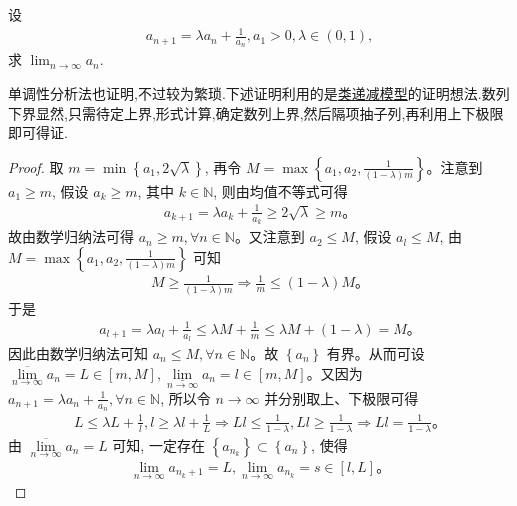 \documentclass[lang=cn,newtx,10pt,scheme=chinese]{../Template/elegantbook}
\begin{document}
\begin{example}
设
\begin{align*}
a_{n+1} = \lambda a_n + \frac{1}{a_n}, a_1 > 0, \lambda \in (0,1),
\end{align*}
求 $\lim_{n \to \infty} a_n$.
\end{example}
\begin{note}
单调性分析法也证明,不过较为繁琐.下述证明利用的是\hyperref[Basis of Analytics-example:类递减模型]{类递减模型}的证明想法.数列下界显然,只需待定上界,形式计算,确定数列上界,然后隔项抽子列,再利用上下极限即可得证.
\end{note}
\begin{proof}
取 $m=\min \left\{ a_1,2\sqrt{\lambda} \right\}$, 再令 $M=\max \left\{ a_1,a_2,\frac{1}{\left( 1-\lambda \right) m} \right\}$。注意到 $a_1\geqslant m$, 假设 $a_k\geqslant m$, 其中 $k\in \mathbb{N}$, 则由均值不等式可得
\begin{align*}
a_{k+1}=\lambda a_k+\frac{1}{a_k}\geqslant 2\sqrt{\lambda}\geqslant m。
\end{align*}
故由数学归纳法可得 $a_n\geqslant m,\forall n\in \mathbb{N}$。又注意到 $a_2\leqslant M$, 假设 $a_l\leqslant M$, 由 $M=\max \left\{ a_1,a_2,\frac{1}{\left( 1-\lambda \right) m} \right\}$ 可知
\begin{align*}
M\geqslant \frac{1}{\left( 1-\lambda \right) m}\Rightarrow \frac{1}{m}\leqslant \left( 1-\lambda \right) M。
\end{align*}
于是
\begin{align*}
a_{l+1}=\lambda a_l+\frac{1}{a_l}\leqslant \lambda M+\frac{1}{m}\leqslant \lambda M+\left( 1-\lambda \right) =M。
\end{align*}
因此由数学归纳法可知 $a_n\leqslant M,\forall n\in \mathbb{N}$。故 $\left\{ a_n \right\}$ 有界。从而可设 $\underset{n\rightarrow \infty}{\overline{\lim }}a_n=L\in \left[ m,M \right] ,\underset{n\rightarrow \infty}{\underline{\lim }}a_n=l\in \left[ m,M \right]$。又因为 $a_{n+1}=\lambda a_n+\frac{1}{a_n},\forall n\in \mathbb{N}$, 所以令 $n\rightarrow \infty$ 并分别取上、下极限可得
\begin{align*}
L\leqslant \lambda L+\frac{1}{l},l\geqslant \lambda l+\frac{1}{L}\Rightarrow Ll\leqslant \frac{1}{1-\lambda},Ll\geqslant \frac{1}{1-\lambda}\Rightarrow Ll=\frac{1}{1-\lambda}。
\end{align*}
由 $\underset{n\rightarrow \infty}{\overline{\lim }}a_n=L$ 可知, 一定存在 $\left\{ a_{n_k} \right\} \subset \left\{ a_n \right\}$, 使得
\begin{align*}
\underset{n\rightarrow \infty}{\lim}a_{n_k+1}=L,\underset{n\rightarrow \infty}{\lim}a_{n_k}=s\in \left[ l,L \right]。

\end{align*}
\end{proof}
\end{document}
